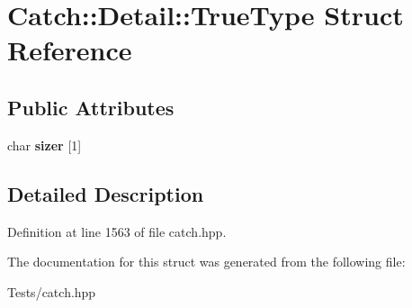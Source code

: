\hypertarget{struct_catch_1_1_detail_1_1_true_type}{}\section{Catch\+:\+:Detail\+:\+:True\+Type Struct Reference}
\label{struct_catch_1_1_detail_1_1_true_type}
\subsection*{Public Attributes}
\begin{DoxyCompactItemize}
\item 
\mbox{\label{struct_catch_1_1_detail_1_1_true_type_a3aaaeb75909e668b293c8a81f5fb6419}} 
char {\bfseries sizer} \mbox{[}1\mbox{]}
\end{DoxyCompactItemize}


\subsection{Detailed Description}


Definition at line 1563 of file catch.\+hpp.



The documentation for this struct was generated from the following file\+:\begin{DoxyCompactItemize}
\item 
Tests/catch.\+hpp\end{DoxyCompactItemize}

